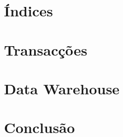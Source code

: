 \documentclass[11pt,a4paper]{article}
\begin{document}
\newpage
\section{Índices}
\newpage
\section{Transacções}

\newpage

\section{Data Warehouse}
\newpage

\section{Conclusão}
\newpage
\end{document}
